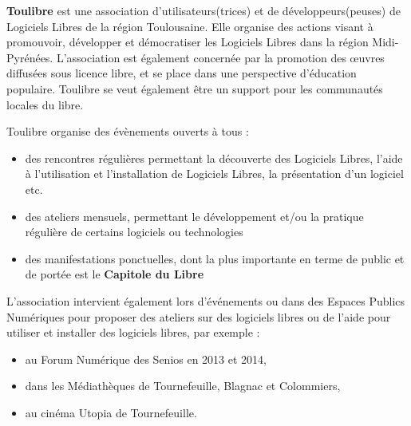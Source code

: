 
\textbf{Toulibre} est une association d'utilisateurs(trices) et de 
développeurs(peuses) de Logiciels Libres de la région Toulousaine. 
Elle organise des actions visant à promouvoir, développer et 
démocratiser les Logiciels Libres dans la région Midi-Pyrénées. 
L'association est également concernée par la promotion des œuvres 
diffusées sous licence libre, et se place dans une perspective 
d'éducation populaire.
Toulibre se veut également être un support pour les communautés 
locales du libre.

\Separateur

Toulibre organise des évènements ouverts à tous :
\begin{itemize}[label=$\bullet$]
\item des rencontres régulières permettant la découverte des 
Logiciels Libres, l'aide à l'utilisation et l'installation de 
Logiciels Libres, la présentation d'un logiciel etc.
\item des ateliers mensuels, permettant le développement et/ou la 
pratique régulière de certains logiciels ou technologies
\item des manifestations ponctuelles, dont la plus importante en terme 
de public et de portée est le \textbf{Capitole du Libre}
\end{itemize}

L'association intervient également lors d'événements ou dans des 
Espaces Publics Numériques pour proposer des ateliers sur des 
logiciels libres ou de l'aide pour utiliser et installer des logiciels 
libres, par exemple :
\begin{itemize}[label=$\bullet$]
\item au Forum Numérique des Senios en 2013 et 2014,
\item dans les Médiathèques de Tournefeuille, Blagnac et Colommiers,
\item au cinéma Utopia de Tournefeuille.
\end{itemize}
